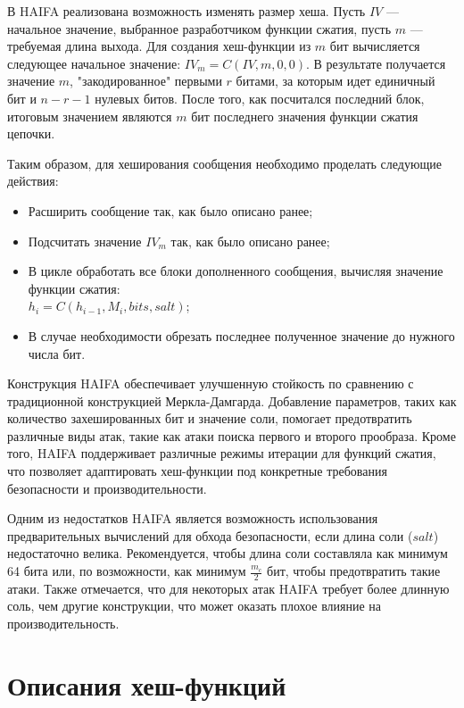 \documentclass{./civarticle}
\begin{document}
В HAIFA реализована возможность изменять размер хеша. Пусть $IV$ --- начальное значение, выбранное разработчиком функции сжатия, пусть $m$ --- требуемая длина выхода. Для создания хеш-функции из $m$ бит вычисляется следующее начальное значение: $IV_m = C(IV, m, 0, 0)$. В результате получается значение $m$, "закодированное" первыми $r$ битами, за которым идет единичный бит и $n-r-1$ нулевых битов. После того, как посчитался последний блок, итоговым значением являются $m$ бит последнего значения функции сжатия цепочки.

Таким образом, для хеширования сообщения необходимо проделать следующие действия:

\begin{itemize}
    \item Расширить сообщение так, как было описано ранее;
    \item Подсчитать значение $IV_m$ так, как было описано ранее;
    \item В цикле обработать все блоки дополненного сообщения, вычисляя значение функции сжатия:\\ $h_i = C(h_{i-1}, M_i, bits, salt)$;
    \item В случае необходимости обрезать последнее полученное значение до нужного числа бит.
\end{itemize}

Конструкция HAIFA обеспечивает улучшенную стойкость по сравнению с традиционной конструкцией Меркла-Дамгарда. Добавление параметров, таких как количество захешированных бит и значение соли, помогает предотвратить различные виды атак, такие как атаки поиска первого и второго прообраза. Кроме того, HAIFA поддерживает различные режимы итерации для функций сжатия, что позволяет адаптировать хеш-функции под конкретные требования безопасности и производительности.

Одним из недостатков HAIFA является возможность использования предварительных вычислений для обхода безопасности, если длина соли ($salt$) недостаточно велика. Рекомендуется, чтобы длина соли составляла как минимум 64 бита или, по возможности, как минимум $\frac{m_c}{2}$ бит, чтобы предотвратить такие атаки. Также отмечается, что для некоторых атак HAIFA требует более длинную соль, чем другие конструкции, что может оказать плохое влияние на производительность.

\section{Описания хеш-функций}
\end{document}
